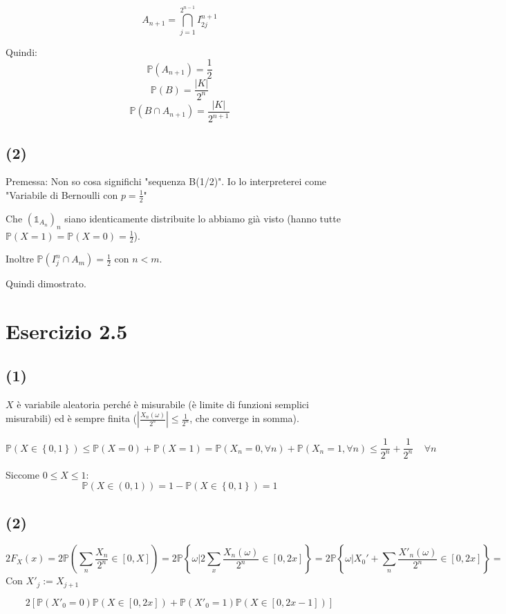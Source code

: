 \documentclass{article}
\begin{document}
\[
	A_{n+1} = \bigcap_{j=1}^{2^{n-1}} I_{2j}^{n+1}
\]

Quindi:
\[
	\mathbb{P}(A_{n+1}) = \frac{1}{2}
\]
\[
	\mathbb{P}(B) = \frac{|K|}{2^n}
\]
\[
	\mathbb{P}\left(B \cap  A_{n+1}\right) = \frac{|K|}{2^{n+1}}
\]

\subsection{(2)}
Premessa: Non so cosa significhi "sequenza B(1/2)". Io lo interpreterei come "Variabile di Bernoulli con $p=\frac{1}{2}$"

Che $\left(\mathds{1}_{A_n}\right)_n$ siano identicamente distribuite lo abbiamo già visto (hanno tutte $\mathbb{P}(X=1)= \mathbb{P}(X=0) = \frac{1}{2}$).

Inoltre $\mathbb{P}\left(I_j^n \cap A_m\right) = \frac{1}{2}$ con $n<m$.

Quindi dimostrato.

\section{Esercizio 2.5}
\subsection{(1)}
$X$ è variabile aleatoria perché è misurabile (è limite di funzioni semplici misurabili) ed è sempre finita ($\left| \frac{X_n(\omega )}{2^n} \right| \leq  \frac{1}{2^n}$, che converge in somma).

\[
	\mathbb{P}\left(X\in \left\{0,1\right\}\right) \leq  \mathbb{P}\left(X=0\right) + \mathbb{P}\left(X=1\right) = \mathbb{P}\left(X_n = 0, \forall  n\right) + \mathbb{P}\left(X_n = 1, \forall  n\right)  \leq  \frac{1}{2^n} + \frac{1}{2^n} \ \ \ \ \  \forall  n
\]

Siccome $0 \leq  X \leq  1$:
\[
	\mathbb{P}\left(X \in (0,1)\right) = 1-\mathbb{P}\left(X \in \left\{0,1\right\}\right) = 1
\]

\subsection{(2)}
\[
	2F_X(x) = 2\mathbb{P}\left(\sum_{n} \frac{X_n}{2^n} \in  [0,X]\right) = 2 \mathbb{P}\left\{\omega  | 2\sum_{x}\frac{X_n (\omega )}{2^n} \in  [0,2x]\right\} = 2\mathbb{P}\left\{\omega  | X_0' + \sum_{n}\frac{X'_n(\omega )}{2^n} \in  [0,2x]\right\} = 
\]
Con $X'_j := X_{j+1}$

\[
	2\left[\mathbb{P}\left(X'_0=0\right) \mathbb{P}\left(X\in [0,2x]\right)  +  \mathbb{P}\left(X'_0=1\right)\mathbb{P}\left(X\in [0,2x-1]\right)\right]
\]
\end{document}
